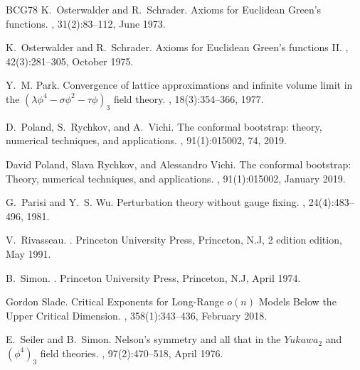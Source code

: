 \documentclass[a4paper,11pt]{article}
\numberwithin{equation}{section}
\begin{document}
\begin{thebibliography}{BCG{\etalchar{+}}78}
K.~Osterwalder and R.~Schrader.
\newblock Axioms for {Euclidean} {Green}'s functions.
, 31(2):83--112, June
  1973.

K.~Osterwalder and R.~Schrader.
\newblock Axioms for {Euclidean} {Green}'s functions {II}.
, 42(3):281--305, October
  1975.

Y.~M. Park.
\newblock Convergence of lattice approximations and infinite volume limit in
  the $(\lambda \phi^4-\sigma \phi^2 -\tau \phi )_3$ field theory.
, 18(3):354--366, 1977.

D.~Poland, S.~Rychkov, and A.~Vichi.
\newblock The conformal bootstrap: theory, numerical techniques, and
  applications.
, 91(1):015002, 74, 2019.

David Poland, Slava Rychkov, and Alessandro Vichi.
\newblock The conformal bootstrap: {Theory}, numerical techniques, and
  applications.
, 91(1):015002, January 2019.

G.~Parisi and Y.~S. Wu.
\newblock Perturbation theory without gauge fixing.
, 24(4):483--496, 1981.

V.~Rivasseau.
.
\newblock Princeton University Press, Princeton, N.J, 2 edition edition, May
  1991.

B.~Simon.
.
\newblock Princeton University Press, Princeton, N.J, April 1974.

Gordon Slade.
\newblock Critical {Exponents} for {Long}-{Range} $o(n)$ {Models} {Below} the
  {Upper} {Critical} {Dimension}.
, 358(1):343--436,
  February 2018.

E.~Seiler and B.~Simon.
\newblock Nelson's symmetry and all that in the ${Yukawa}_2$ and $(\phi^4)_3$
  field theories.
, 97(2):470--518, April 1976.


\end{thebibliography}
\end{document}

